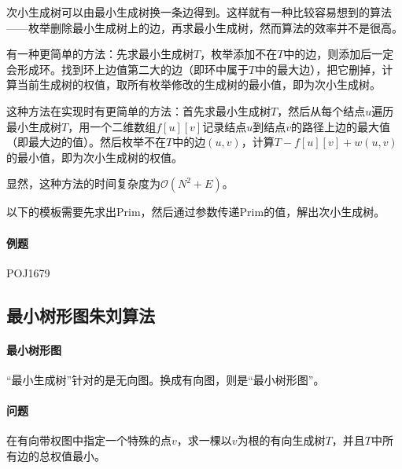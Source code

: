 次小生成树可以由最小生成树换一条边得到。这样就有一种比较容易想到的算法——枚举删除最小生成树上的边，再求最小生成树，然而算法的效率并不是很高。

有一种更简单的方法：先求最小生成树$T$，枚举添加不在$T$中的边，则添加后一定会形成环。找到环上边值第二大的边（即环中属于$T$中的最大边），把它删掉，计算当前生成树的权值，取所有枚举修改的生成树的最小值，即为次小生成树。

这种方法在实现时有更简单的方法：首先求最小生成树$T$，然后从每个结点$u$遍历最小生成树$T$，用一个二维数组$f[u][v]$记录结点$u$到结点$v$的路径上边的最大值（即最大边的值）。然后枚举不在$T$中的边$(u, v)$，计算$T-f[u][v]+w(u,v)$的最小值，即为次小生成树的权值。

显然，这种方法的时间复杂度为$\mathcal{O}(N^2+E)$。

以下的模板需要先求出Prim，然后通过参数传递Prim的值，解出次小生成树。

\paragraph{例题} POJ1679



\subsection{最小树形图朱刘算法}

\paragraph{最小树形图} “最小生成树”针对的是无向图。换成有向图，则是“最小树形图”。

\paragraph{问题} 在有向带权图中指定一个特殊的点$v$，求一棵以$v$为根的有向生成树$T$，并且$T$中所有边的总权值最小。


